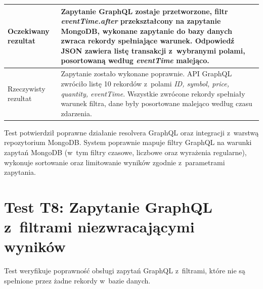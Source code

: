 \begin{table}[H]
\begin{tabular}{|p{}|p{}|}
        Oczekiwany rezultat  & Zapytanie GraphQL zostaje przetworzone, filtr \textit{eventTime.after} przekształcony na zapytanie MongoDB, wykonane zapytanie do bazy danych zwraca rekordy spełniające warunek. Odpowiedź JSON zawiera listę transakcji z~wybranymi polami, posortowaną według \textit{eventTime} malejąco.                                                                   \\ \hline
        Rzeczywisty rezultat & Zapytanie zostało wykonane poprawnie. API GraphQL zwróciło listę 10 rekordów z~polami \textit{ID, symbol, price, quantity, eventTime}. Wszystkie zwrócone rekordy spełniały warunek filtra, dane były posortowane malejąco według czasu zdarzenia.                                                                                                              \\ \hline
    \end{tabular}
\end{table}

Test potwierdził poprawne działanie resolvera GraphQL oraz integracji z~warstwą repozytorium MongoDB\@.
System poprawnie mapuje filtry GraphQL na warunki zapytań MongoDB (w~tym filtry czasowe, liczbowe oraz wyrażenia regularne),
wykonuje sortowanie oraz limitowanie wyników zgodnie z~parametrami zapytania.

\newpage


\section[Test T8: Zapytanie GraphQL z filtrami niezwracającymi wyników]{Test T8: Zapytanie GraphQL z~filtrami niezwracającymi wyników}
\label{sec:test_graphql_empty}

Test weryfikuje poprawność obsługi zapytań GraphQL z~filtrami, które nie są spełnione przez żadne rekordy w~bazie
danych.

\vspace{0.5cm}


